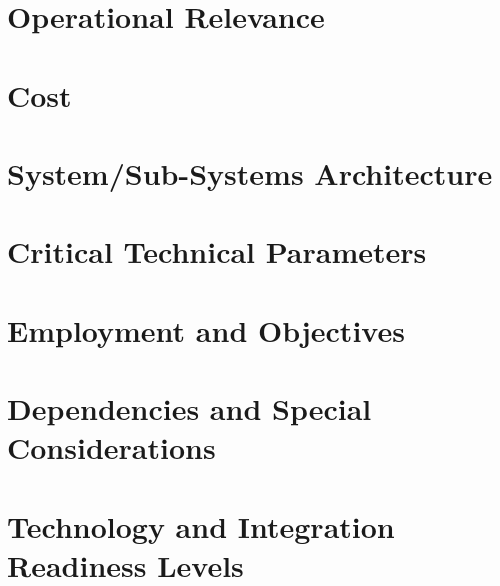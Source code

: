 \documentclass[letterpaper,notitlepage]{article}
\begin{document}
\section{Operational Relevance}
\begin{comment}

\end{comment}


\section{Cost}
\begin{comment}

\end{comment}


\section{System/Sub-Systems Architecture}
\begin{comment}

\end{comment}


\section{Critical Technical Parameters}
\begin{comment}

\end{comment}


\section{Employment and Objectives}
\begin{comment}

\end{comment}


\section{Dependencies and Special Considerations}
\begin{comment}

\end{comment}


\section{Technology and Integration Readiness Levels}
\begin{comment}

\end{comment}
\end{document}
